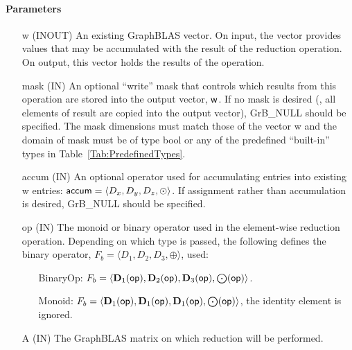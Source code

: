 \paragraph{Parameters}

\begin{itemize}[leftmargin=1.1in]
    \item[{\sf w}]    ({\sf INOUT}) An existing GraphBLAS vector.  On input,
    the vector provides values that may be accumulated with the result of the
    reduction operation.  On output, this vector holds the results of the
    operation.

    \item[{\sf mask}]  ({\sf IN}) An optional ``write'' mask that controls which
    results from this operation are stored into the output vector,
    ${\sf w}$.  If no mask is desired (\ie, all elements
    of result are copied into the output vector), {\sf GrB\_NULL}
    should be specified. The mask dimensions must match those of the
    vector {\sf w} and the domain of {\sf mask} must be
    of type {\sf bool} or any of the predefined ``built-in'' types in
    Table~\ref{Tab:PredefinedTypes}.

    \item[{\sf accum}]    ({\sf IN}) An optional operator used for accumulating
    entries into existing {\sf w} entries: ${\sf accum} = \langle D_x,
    D_y, D_z,\odot \rangle$. If assignment rather than accumulation is
    desired, {\sf GrB\_NULL} should be specified.

    \item[{\sf op}]    ({\sf IN}) The monoid or binary operator 
    used in the element-wise reduction operation.  Depending on which type is
    passed, the following defines the binary operator, $F_b=\langle D_1,D_2,D_3,\oplus \rangle$, used:
    \begin{itemize}[leftmargin=1.1in]
    \item[BinaryOp:] $F_b = \langle \bold{D}_1({\sf op}), \bold{D}_2({\sf op}),
    \bold{D}_3({\sf op}),\bold{\bigodot}({\sf op})\rangle$.  
    \item[Monoid:] $F_b = \langle \bold{D}_1({\sf op}), \bold{D}_1({\sf op}),
    \bold{D}_1({\sf op}),\bold{\bigodot}({\sf op})\rangle$,
    the identity element is ignored. 
    \end{itemize}
    
    \item[{\sf A}]     ({\sf IN}) The GraphBLAS matrix on which
	    reduction will be performed.
    

\end{itemize}
